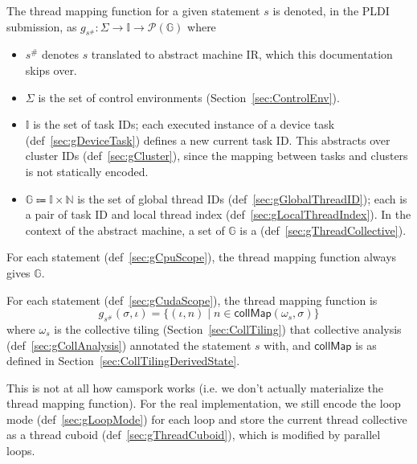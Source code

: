 

The thread mapping function for a given statement $s$ is denoted, in the PLDI submission, as $g_{s^\#}: \Sigma \to \mathbb{I} \to \mathcal{P}(\mathbb{G})$ where
\begin{itemize}
  \item $s^\#$ denotes $s$ translated to abstract machine IR, which this documentation skips over.
  \item $\Sigma$ is the set of control environments (Section~\ref{sec:ControlEnv}).
  \item $\mathbb{I}$ is the set of task IDs; each executed instance of a device task (def~\ref{sec:gDeviceTask}) defines a new current task ID.
  This abstracts over cluster IDs (def~\ref{sec:gCluster}), since the mapping between tasks and clusters is not statically encoded.
  \item $\mathbb{G} \Coloneqq \mathbb{I} \times \mathbb{N}$ is the set of global thread IDs (def~\ref{sec:gGlobalThreadID}); each is a pair of task ID and local thread index (def~\ref{sec:gLocalThreadIndex}).
  In the context of the abstract machine, a set of $\mathbb{G}$ is a  (def~\ref{sec:gThreadCollective}).
\end{itemize}

For each  statement (def~\ref{sec:gCpuScope}), the thread mapping function always gives $\mathbb{G}$.

For each  statement (def~\ref{sec:gCudaScope}), the thread mapping function is
\begin{equation*}
    g_{s^\#}(\sigma, \iota) = \{ (\iota, n) \mid n \in \textsf{collMap}(\omega_s, \sigma) \}
\end{equation*}
where $\omega_s$ is the collective tiling (Section~\ref{sec:CollTiling}) that collective analysis (def~\ref{sec:gCollAnalysis}) annotated the statement $s$ with, and $\mathsf{collMap}$ is as defined in Section~\ref{sec:CollTilingDerivedState}.

 This is not at all how camspork works (i.e. we don't actually materialize the thread mapping function).
For the real implementation, we still encode the loop mode (def~\ref{sec:gLoopMode}) for each loop and store the current thread collective as a thread cuboid (def~\ref{sec:gThreadCuboid}), which is modified by parallel loops.


